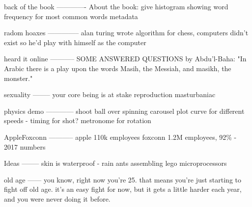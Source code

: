 back of the book
-------------
About the book:
give histogram showing word frequency for most common words
metadata

radom hoaxes
--------------
alan turing wrote algorithm for chess, computers didn't exist so he'd play with himself as the computer

heard it online
-----------
 SOME ANSWERED QUESTIONS by Abdu'l-Baha: "In Arabic there is a play upon the words Masih, the Messiah, and masikh, the monster."

sexuality
--------
your core being is at stake reproduction
masturbaniac

physics demo
------------
shoot ball over spinning carousel
plot curve for different speeds
 - timing for shot? metronome for rotation

AppleFoxconn
-----------
apple 110k employees foxconn 1.2M employees, 92\% - 2017 numbers

Ideas
--------
skin is waterproof - rain
ants assembling lego microprocessors

old age
------
you know, right now you're 25. that means you're just starting to fight off old age. it's an easy fight for now, but it gets a little harder each year, and you were never doing it before.


